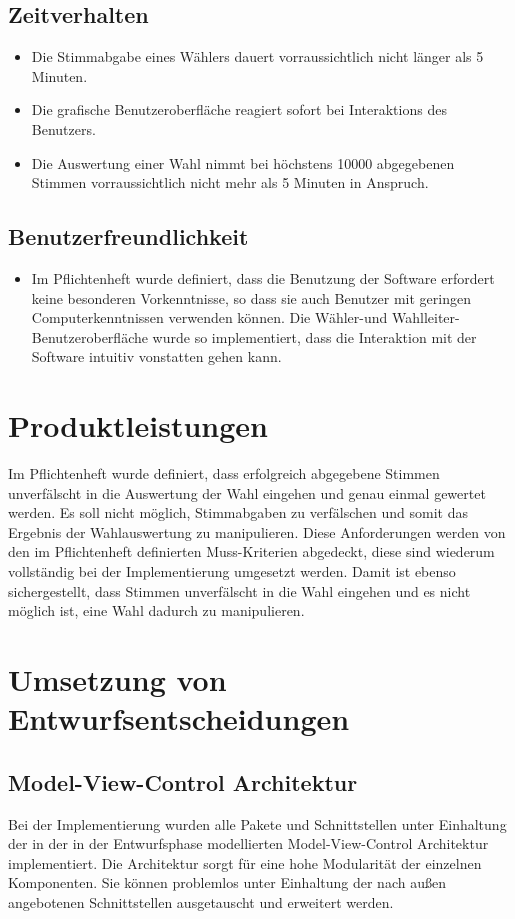 \documentclass[parskip=full]{scrartcl}
\begin{document}
\subsection{Zeitverhalten}

\begin{itemize}
	\item Die Stimmabgabe eines Wählers dauert vorraussichtlich nicht länger als 5 Minuten.
	\item Die grafische Benutzeroberfläche reagiert sofort bei Interaktions des Benutzers.
	\item Die Auswertung einer Wahl nimmt bei höchstens 10000 abgegebenen Stimmen vorraussichtlich nicht mehr als 5 Minuten in Anspruch.
\end{itemize}

\subsection{Benutzerfreundlichkeit}
\begin{itemize}
	\item Im Pflichtenheft wurde definiert, dass die Benutzung der Software erfordert keine besonderen Vorkenntnisse, so dass sie auch Benutzer mit geringen Computerkenntnissen verwenden können. Die Wähler-und Wahlleiter-Benutzeroberfläche wurde so implementiert, dass die Interaktion mit der Software intuitiv vonstatten gehen kann.
\end{itemize}

\section{Produktleistungen}
Im Pflichtenheft wurde definiert, dass erfolgreich abgegebene Stimmen unverfälscht in die Auswertung der Wahl eingehen und genau einmal gewertet werden. Es soll nicht möglich, Stimmabgaben zu verfälschen und somit das Ergebnis der Wahlauswertung zu manipulieren.
Diese Anforderungen werden von den im Pflichtenheft definierten Muss-Kriterien abgedeckt, diese sind wiederum vollständig bei der Implementierung umgesetzt werden. Damit ist ebenso sichergestellt, dass Stimmen unverfälscht in die Wahl eingehen und es nicht möglich ist, eine Wahl dadurch zu manipulieren.

		
\section{Umsetzung von Entwurfsentscheidungen}
\subsection{Model-View-Control Architektur}
Bei der Implementierung wurden alle Pakete und Schnittstellen unter Einhaltung der in der in der Entwurfsphase modellierten Model-View-Control Architektur implementiert. Die Architektur sorgt für eine hohe Modularität der einzelnen Komponenten. Sie können problemlos unter Einhaltung der nach außen angebotenen Schnittstellen ausgetauscht und erweitert werden. 
\end{document}
